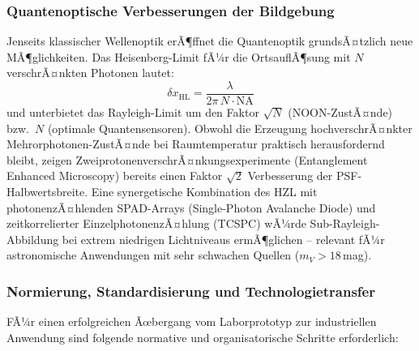 ﻿\documentclass[12pt,a4paper]{article}
\theoremstyle{definition}
\begin{document}
	\subsubsection{Quantenoptische Verbesserungen der Bildgebung}

	Jenseits klassischer Wellenoptik erÃ¶ffnet die Quantenoptik
	grundsÃ¤tzlich neue MÃ¶glichkeiten.  Das Heisenberg-Limit fÃ¼r die
	OrtsauflÃ¶sung mit $N$ verschrÃ¤nkten Photonen lautet:
	\begin{equation}
		\delta x_\mathrm{HL}
		= \frac{\lambda}{2\pi\,N\cdot\mathrm{NA}}
		\label{eq:heisenberg_limit}
	\end{equation}
	und unterbietet das Rayleigh-Limit um den Faktor $\sqrt{N}$
	(NOON-ZustÃ¤nde) bzw.\ $N$ (optimale Quantensensoren).  Obwohl
	die Erzeugung hochverschrÃ¤nkter Mehrorphotonen-ZustÃ¤nde bei
	Raumtemperatur praktisch herausfordernd bleibt, zeigen
	ZweiprotonenverschrÃ¤nkungsexperimente (Entanglement Enhanced
	Microscopy) bereits einen Faktor $\sqrt{2}$ Verbesserung der
	PSF-Halbwertsbreite.  Eine synergetische Kombination des HZL
	mit photonenzÃ¤hlenden SPAD-Arrays (Single-Photon Avalanche Diode)
	und zeitkorrelierter EinzelphotonenzÃ¤hlung (TCSPC) wÃ¼rde
	Sub-Rayleigh-Abbildung bei extrem niedrigen Lichtniveaus
	ermÃ¶glichen -- relevant fÃ¼r astronomische Anwendungen mit
	sehr schwachen Quellen ($m_V > 18$\,mag).

	\subsubsection{Normierung, Standardisierung und Technologietransfer}

	FÃ¼r einen erfolgreichen Ãœbergang vom Laborprototyp zur industriellen
	Anwendung sind folgende normative und organisatorische Schritte
	erforderlich:
\end{document}
